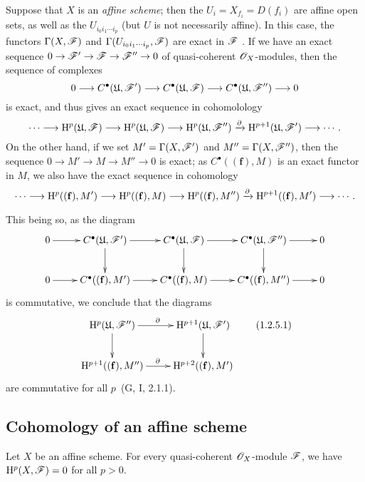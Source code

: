 \begin{remark}[1.2.5]
\label{3.1.2.5}
Suppose that $X$ is an \emph{affine scheme}; then the $U_i=X_{f_i}=D(f_i)$ are affine open sets, as well as the $U_{i_0 i_1\cdots i_p}$ (but $U$ is not necessarily affine).
In this case, the functors $\Gamma(X,\mathscr{F})$ and $\Gamma(U_{i_0 i_1\cdots i_p},\mathscr{F})$ are exact in $\mathscr{F}$ .
If we have an exact sequence $0\to\sh{F}'\to\sh{F}\to\sh{F}''\to 0$ of quasi-coherent $\mathscr{O}_X$-modules, then the sequence of complexes
\[
  0\to C^\bullet(\mathfrak{U},\sh{F}')\to C^\bullet(\mathfrak{U},\sh{F})\to C^\bullet(\mathfrak{U},\sh{F}'')\to 0
\]
is exact, and thus gives an exact sequence in cohomolology
\[
  \cdots\to\HH^p(\mathfrak{U},\sh{F})\to\HH^p(\mathfrak{U},\sh{F})\to\HH^p(\mathfrak{U},\sh{F}'')\xrightarrow{\partial}\HH^{p+1}(\mathfrak{U},\sh{F}')\to\cdots.
\]
On the other hand, if we set $M'=\Gamma(X,\mathscr{F}')$ and $M''=\Gamma(X,\mathscr{F}'')$, then the sequence $0\to M'\to M\to M''\to 0$ is exact; as $C^\bullet((\mathbf{f}),M)$ is an exact functor in $M$, we also have the exact sequence in cohomology
\[
  \cdots\to\HH^p((\mathbf{f}),M')\to\HH^p((\mathbf{f}),M)\to\HH^p((\mathbf{f}),M'')\xrightarrow{\partial}\HH^{p+1}((\mathbf{f}),M')\to\cdots.
\]

This being so, as the diagram
\[
  \xymatrix{
    0\ar[r] &
    C^\bullet(\mathfrak{U},\sh{F}')\ar[r]\ar[d] &
    C^\bullet(\mathfrak{U},\sh{F})\ar[r]\ar[d] &
    C^\bullet(\mathfrak{U},\sh{F}'')\ar[r]\ar[d] &
    0\\
    0\ar[r] &
    C^\bullet((\mathbf{f}),M')\ar[r] &
    C^\bullet((\mathbf{f}),M)\ar[r] &
    C^\bullet((\mathbf{f}),M'')\ar[r] &
    0
  }
\]
is commutative, we conclude that the diagrams
\[
  \xymatrix{
    \HH^p(\mathfrak{U},\sh{F}'')\ar[r]^\partial\ar[d] &
    \HH^{p+1}(\mathfrak{U},\sh{F}')\ar[d]\\
    \HH^{p+1}((\mathbf{f}),M'')\ar[r]^\partial &
    \HH^{p+2}((\mathbf{f}),M')
  }
  \tag{1.2.5.1}
\]
are commutative for all $p$~(G, I, 2.1.1).
\end{remark}

\subsection{Cohomology of an affine scheme}
\label{subsection:3.1.3}

\begin{theorem}[1.3.1]
\label{3.1.3.1}
Let $X$ be an affine scheme.
For every quasi-coherent $\mathscr{O}_X$-module $\mathscr{F}$, we have $\mathrm{H}^p(X,\mathscr{F})=0$ for all $p>0$.
\end{theorem}

